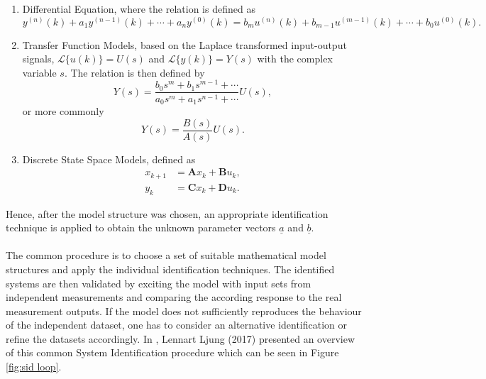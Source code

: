 \documentclass[english]{isasthesis}
\begin{document}
    	\begin{enumerate}
    		\item Differential Equation, where the relation is defined as
    		\begin{equation}\label{eq:differential}
    		y^{(n)}(k)+ a_1y^{(n-1)}(k)+\cdots+a_ny^{(0)}(k) = b_mu^{(n)}(k) + b_{m-1}u^{(m-1)}(k)+\cdots+b_0u^{(0)}(k). 
    		\end{equation}
    		\item Transfer Function Models, based on the Laplace transformed input-output signals, $\mathcal{L}\{u(k)\} = U(s)$ and $\mathcal{L}\{y(k)\} = Y(s)$ with the complex variable $s$. The relation is then defined by 
    		\begin{equation}
    		Y(s) = \frac{b_0s^m + b_1s^{m-1}+\cdots}{a_0s^m + a_1s^{n-1} + \cdots} U(s),
    		\end{equation}
    		or more commonly
    		\begin{equation}\label{eq:transfer function}
    		Y(s) = \frac{B(s)}{A(s)}U(s).
    		\end{equation}
    		\item Discrete State Space Models, defined as 
    		\begin{equation}\label{eq:state space}
    		\begin{aligned}
    		x_{k+1} &= \mathbf{A}x_k + \mathbf{B}u_k, \\
    		y_k &= \mathbf{C}x_k + \mathbf{D}u_k.
    		\end{aligned}   		    		
    		\end{equation}
    	\end{enumerate}
    	Hence, after the model structure was chosen, an appropriate identification technique is applied to obtain the unknown parameter vectors $\underline{a}$ and $\underline{b}$.\\\\
   The common procedure is to choose a set of suitable mathematical model structures and apply the individual identification techniques. The identified systems are then validated by exciting the model with input sets from independent measurements and comparing the according response to the real measurement outputs. If the model does not sufficiently reproduces the behaviour of the independent dataset, one has to consider an alternative identification or refine the datasets accordingly. In \cite{sid}, Lennart Ljung (2017) presented an overview of this common System Identification procedure which can be seen in Figure \ref{fig:sid loop}.\\ \\
\end{document}
